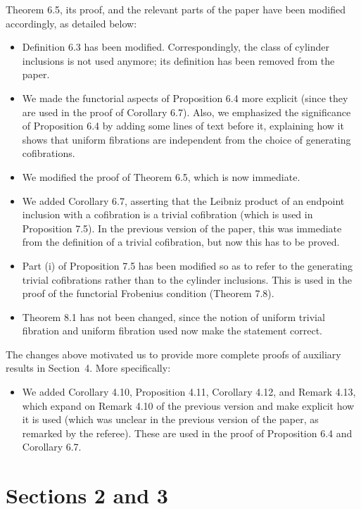 \documentclass[reqno,10pt,a4paper,oneside,draft]{amsart}
\begin{document}
Theorem 6.5, its proof, and the relevant parts of the paper have been modified accordingly, as detailed below:

\begin{itemize} 
\item Definition 6.3 has been modified. Correspondingly, the class of cylinder inclusions is not used anymore;
its definition has been removed from the paper. 
\item We made the functorial aspects of Proposition 6.4 more explicit  (since they are used in the proof of Corollary 6.7). 
Also, we emphasized the significance of Proposition 6.4 by adding some lines of text before it, explaining how it shows that uniform fibrations are independent from the choice of generating cofibrations.
\item We modified the proof of Theorem 6.5, which is now immediate. 
\item We added Corollary 6.7, asserting that the Leibniz product of an endpoint inclusion with a cofibration is
a trivial cofibration (which is used in Proposition 7.5).  In the previous version of the paper, this was immediate from the definition of a trivial cofibration, but now this has to be proved. 
\item  Part (i)  of Proposition 7.5 has been modified so as to refer to the generating trivial cofibrations rather than to the cylinder inclusions. This is used in the proof of the functorial Frobenius condition (Theorem 7.8).
\item Theorem 8.1 has not been changed, since the notion of uniform trivial fibration and uniform fibration used now
make the statement correct. 
\end{itemize} 

The changes above motivated us to provide more complete proofs of auxiliary results in Section~4. More specifically: 
\begin{itemize}
\item We added Corollary 4.10, Proposition 4.11, Corollary 4.12, and Remark 4.13, which expand on Remark 4.10 of the previous version and make explicit how it is used (which was unclear in the previous version of the paper, as remarked by the referee). These are used in the proof of 
Proposition 6.4 and Corollary 6.7. 
\end{itemize}


\section*{Sections 2 and 3} 
\end{document}
